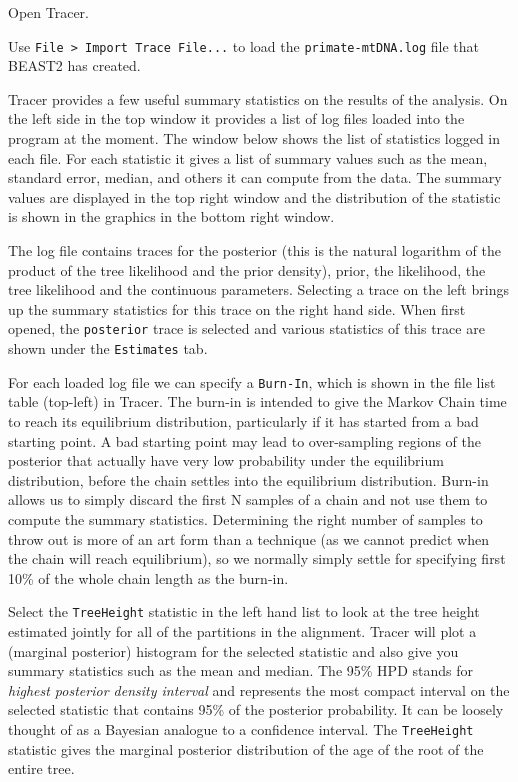 \documentclass[11pt]{article}
\begin{document}
\begin{framed}
Open Tracer.

Use \texttt{File > Import Trace File...} to load the \texttt{primate-mtDNA.log} file that BEAST2 has created.
\end{framed}

Tracer provides a few useful summary statistics on the results of the analysis. On the left side in the top window it provides a list of log files loaded into the program at the moment. The window below shows the list of statistics logged in each file. For each statistic it gives a list of summary values such as the mean, standard error, median, and others it can compute from the data. The summary values are displayed in the top right window and the distribution of the statistic is shown in the graphics in the bottom right window. 

The log file contains traces for the posterior (this is the natural logarithm of the product of the tree likelihood and the prior density), prior, the likelihood, the tree likelihood and the continuous parameters. Selecting a trace on the left brings up the summary statistics for this trace on the right hand side. When first opened, the \texttt{posterior} trace is selected and various statistics of this trace are shown under the \texttt{Estimates} tab.

For each loaded log file we can specify a \texttt{Burn-In}, which is shown in the file list table (top-left) in Tracer. The burn-in is intended to give the Markov Chain time to reach its equilibrium distribution, particularly if it has started from a bad starting point. A bad starting point may lead to over-sampling regions of the posterior that actually have very low probability under the equilibrium distribution, before the chain settles into the equilibrium distribution. Burn-in allows us to simply discard the first N samples of a chain and not use them to compute the summary statistics. Determining the right number of samples to throw out is more of an art form than a technique (as we cannot predict when the chain will reach equilibrium), so we normally simply settle for specifying first 10\% of the whole chain length as the burn-in.

Select the \texttt{TreeHeight} statistic in the left hand list to look at the tree height estimated jointly for all of the partitions in the alignment. Tracer will plot a (marginal posterior) histogram for the selected statistic and also give you summary statistics such as the mean and median. The 95\% HPD stands for \textit{highest posterior density interval} and represents the most compact interval on the selected statistic that contains 95\% of the posterior probability. It can be loosely thought of as a Bayesian analogue to a confidence interval. The \texttt{TreeHeight} statistic gives the marginal posterior distribution of the age of the root of the entire tree.
\end{document}

